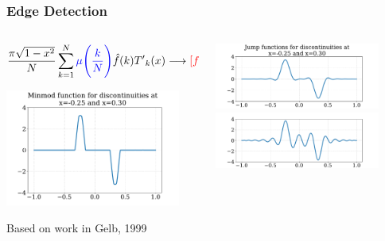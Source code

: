 \documentclass[9pt,usepdftitle=false,aspectratio=169]{beamer}
\begin{document}
\begin{frame}
  \frametitle{Edge Detection}
  \begin{columns}
    \begin{column}{0.5\textwidth}
      \begin{Large}
        \begin{displaymath}
          \frac{\pi\sqrt{1-x^2}}{N}\sum^N_{k=1} {\color{blue}\mu\Bigg(\frac{k}{N}\Bigg)}
          \hat{f}(k){T^\prime}_k(x) \longrightarrow {\color{red}[f](x)}
        \end{displaymath}
      \end{Large}
      \vspace{0.025\textwidth}
      \begin{center}
        \includegraphics[width=0.9\textwidth]{minmod_good}
      \end{center}
      {\small Based on work in Gelb, 1999}
    \end{column}
    \begin{column}{0.5\textwidth}
      \begin{center}
        \includegraphics[width=0.85\textwidth]{jump_trig}\\
        \includegraphics[width=0.85\textwidth]{jump_poly}\\

\end{center}
\end{column}
\end{columns}
\end{frame}
\end{document}

